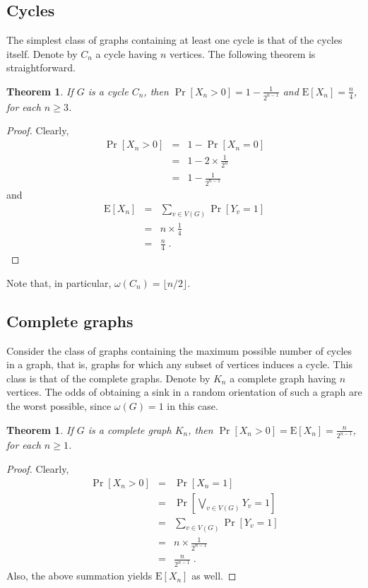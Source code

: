 \documentclass{article}
\newtheorem{thm}[lem]{Theorem}
\begin{document}
\subsection{Cycles}

The simplest class of graphs containing at least one cycle is that of the cycles
itself. Denote by $C_n$ a cycle having $n$ vertices. The following theorem is
straightforward.

\begin{thm}
\label{PXEXCn}
If $G$ is a cycle $C_n$, then $\Pr[X_n > 0] = 1 - \frac{1}{2^{n-1}}$ and
$\mathrm{E}[X_n] = \frac{n}{4}$, for each $n \geq 3$.
\end{thm}

\begin{proof}
Clearly, 
\begin{eqnarray*}
	 \Pr[X_n > 0] & = & 1 - \Pr[X_n = 0] \\
				  & = & 1 - 2 \times \frac{1}{2^n} \\
				  & = & 1 - \frac{1}{2^{n-1}}
\end{eqnarray*}
and
\begin{eqnarray*}
	 \mathrm{E}[X_n] & = & \sum_{v \in V(G)} \Pr[Y_v = 1] \\
				     & = & n \times \frac{1}{4} \\
				     & = & \frac{n}{4} \;{.}
\end{eqnarray*}
\end{proof}

Note that, in particular, $\omega(C_n) = \lfloor n/2 \rfloor$.

\subsection{Complete graphs}

Consider the class of graphs containing the maximum possible number of cycles in
a graph, that is, graphs for which any subset of vertices induces a cycle. This
class is that of the complete graphs. Denote by $K_n$ a complete graph having
$n$ vertices. The odds of obtaining a sink in a random orientation of such a
graph are the worst possible, since $\omega(G) = 1$ in this case.

\begin{thm}
\label{PXEXKn}
If $G$ is a complete graph $K_n$, then
$\Pr[X_n > 0] = \mathrm{E}[X_n] = \frac{n}{2^{n-1}}$, for each $n \geq 1$.
\end{thm}

\begin{proof}
Clearly, 
\begin{eqnarray*}
	 \Pr[X_n > 0] & = & \Pr[X_n = 1] \\
				  & = & \Pr[\bigvee_{v \in V(G)} Y_v = 1] \\
			      	& = & \sum_{v \in V(G)} \Pr[Y_v = 1] \\
				  & = & n \times \frac{1}{2^{n-1}} \\
				  & = & \frac{n}{2^{n-1}} \;{.}
\end{eqnarray*} 
Also, the above summation yields $\mathrm{E}[X_n]$ as well.
\end{proof}
\end{document}
